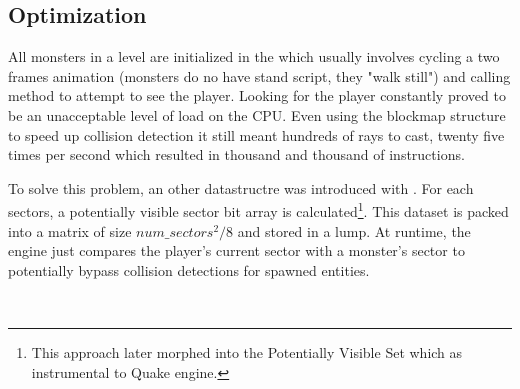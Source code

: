 \subsection{Optimization}
All monsters in a level are initialized in the  which usually involves cycling a two frames animation (monsters do no have stand script, they "walk still") and calling  method to attempt to see the player. Looking for the player constantly proved to be an unacceptable level of load on the CPU. Even using the blockmap structure to speed up collision detection it still meant hundreds of rays to cast, twenty five times per second which resulted in thousand and thousand of instructions.\\
\par
To solve this problem, an other datastructre was introduced with . For each sectors, a potentially visible sector bit array is calculated\footnote{This approach later morphed into the Potentially Visible Set which as instrumental to Quake engine.}. This dataset is packed into a matrix of size $num\_sectors^2/8$ and stored in a  lump. At runtime, the engine just compares the player's current sector with a monster's sector to potentially bypass collision detections for spawned entities.\\
\par
{}
\\
\par
{}
\pagebreak






